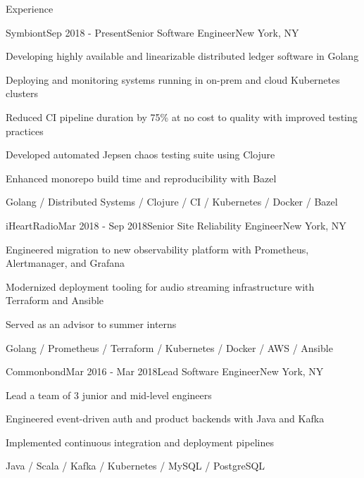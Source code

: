 \documentclass{resume} %
\begin{document}
\begin{rSection}{Experience}

\begin{rSubsection}{Symbiont}{Sep 2018 - Present}{Senior Software Engineer}{New York, NY}
\item Developing highly available and linearizable distributed ledger software in Golang
\item Deploying and monitoring systems running in on-prem and cloud Kubernetes clusters
\item Reduced CI pipeline duration by 75\% at no cost to quality with improved testing practices
\item Developed automated Jepsen chaos testing suite using Clojure
\item Enhanced monorepo build time and reproducibility with Bazel

Golang / Distributed Systems / Clojure / CI / Kubernetes / Docker / Bazel
\end{rSubsection}


\begin{rSubsection}{iHeartRadio}{Mar 2018 - Sep 2018}{Senior Site Reliability Engineer}{New York, NY}
\item Engineered migration to new observability platform with Prometheus, Alertmanager, and Grafana
\item Modernized deployment tooling for audio streaming infrastructure with Terraform and Ansible
\item Served as an advisor to summer interns

Golang / Prometheus / Terraform / Kubernetes / Docker / AWS / Ansible
\end{rSubsection}


\begin{rSubsection}{Commonbond}{Mar 2016 - Mar 2018}{Lead Software Engineer}{New York, NY}
\item Lead a team of 3 junior and mid-level engineers
\item Engineered event-driven auth and product backends with Java and Kafka
\item Implemented continuous integration and deployment pipelines

Java / Scala / Kafka / Kubernetes / MySQL / PostgreSQL
\end{rSubsection}


\end{rSection}
\end{document}
